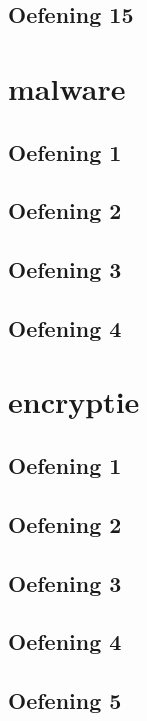 \documentclass[a4paper,11pt]{report}
\begin{document}
\section{Oefening 15}

\newpage

\chapter{malware}
\section{Oefening 1}

\section{Oefening 2}

\section{Oefening 3}

\section{Oefening 4}

\newpage

\chapter{encryptie}
\section{Oefening 1}

\section{Oefening 2}

\section{Oefening 3}

\section{Oefening 4}

\section{Oefening 5}

\end{document}
